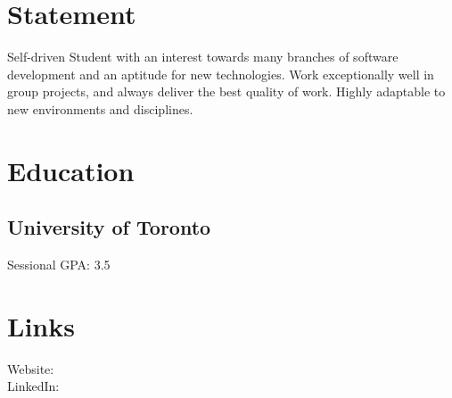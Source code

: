 \documentclass[]{dans-resume}
\begin{document}

\begin{minipage}[t]{0.30\textwidth}

\section{Statement}
Self-driven Student with an interest towards many branches of software development and an aptitude for new technologies. Work exceptionally well in group projects, and always deliver the best quality of work. Highly adaptable to new environments and disciplines.
\sectionsep

\section{Education}
\subsection{University of Toronto}
Sessional GPA: 3.5
\sectionsep

\section{Links}
Website: \href{https://danielrazavi.github.io/}{} \\
LinkedIn: \href{https://www.linkedin.com/in/danielrazavi}{} \\

\sectionsep




\end{minipage}
\end{document}
